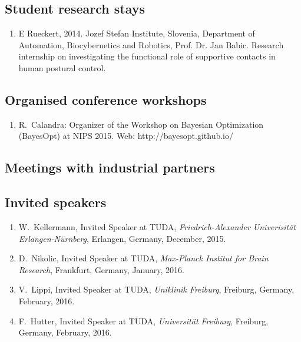 \subsection{Student research stays}

\begin{enumerate}
 \item E Rueckert, 2014. Jozef Stefan Institute, Slovenia, Department of Automation, Biocybernetics and Robotics, Prof. Dr. Jan Babic. Research internship on investigating the functional role of supportive contacts in human postural control. 
\end{enumerate}

\subsection{Organised conference workshops}

\begin{enumerate}
\item  R.~Calandra: Organizer of the Workshop on Bayesian Optimization (BayesOpt) at NIPS 2015. Web: http://bayesopt.github.io/
\end{enumerate}


\subsection{Meetings with industrial partners}


\subsection{Invited speakers}%
\begin{enumerate}
	\item W.~Kellermann, Invited Speaker at TUDA, \emph{Friedrich-Alexander Univerisit\"at Erlangen-N\"urnberg}, Erlangen, Germany, December, 2015.
	\item D.~Nikolic, Invited Speaker at TUDA, \emph{Max-Planck Institut for Brain Research}, Frankfurt, Germany, January, 2016.
	\item V.~Lippi, Invited Speaker at TUDA, \emph{Uniklinik Freiburg}, Freiburg, Germany, February, 2016.
	\item F.~Hutter, Invited Speaker at TUDA, \emph{Universit\"at Freiburg}, Freiburg, Germany, February, 2016.
\end{enumerate}

